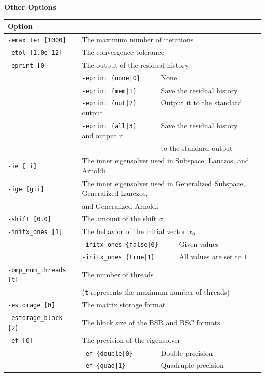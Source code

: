 \documentclass[a4paper]{article}
\begin{document}
\begin{minipage}[t]{\textwidth}
\begin{center}
{\bf Other Options}\\
\begin{tabular}{l|ll}\hline\hline
Option &                          \\ \hline
\verb=-emaxiter [1000]= & The maximum number of iterations         \\ 
\verb=-etol [1.0e-12]=  & The convergence tolerance          \\
\verb=-eprint [0]=      & The output of the residual history                \\
                       & \verb=-eprint {none|0}     =  None \\
                       & \verb=-eprint {mem|1}      =  Save the residual history\\
                       & \verb=-eprint {out|2}      =  Output it to the standard output\\
                       & \verb=-eprint {all|3}      =  Save the residual history and output it \\
                       & \verb=                     =  to the standard output\\
\verb=-ie [ii]= & The inner eigensolver used in Subspace, Lanczos, and Arnoldi\\
\verb=-ige [gii]= & The inner eigensolver used in Generalized Subspace, Generalized Lanczos, \\
                       & and Generalized Arnoldi\\
\verb=-shift [0.0]= & The amount of the shift $\sigma$ \\
\verb=-initx_ones [1]= & The behavior of the initial vector $x_{0}$  \\
                       & \verb=-initx_ones {false|0}     =  Given values \\  
                       & \verb=-initx_ones {true|1}      =  All values are set to $1$ \\
\verb=-omp_num_threads [t]= & The number of threads        \\ 
                            & (\verb=t= represents the maximum number of
 threads) \\
\verb=-estorage [0]=   & The matrix storage format \\
\verb=-estorage_block [2]=& The block size of the BSR and BSC formats\\ 
\verb=-ef [0]=         & The precision of the eigensolver\\
                       & \verb=-ef {double|0}       =  Double precision \\ 
                       & \verb=-ef {quad|1}         =  Quadruple precision \\
\hline         
\end{tabular}
\end{center}
\end{minipage}
\end{document}
